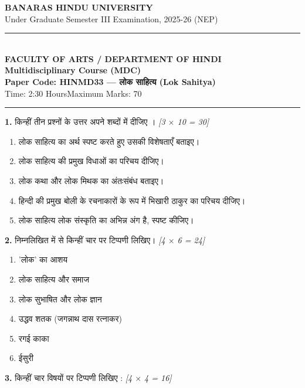 \documentclass[11pt,a4paper]{article}
\newcommand{\pts}[1]{\hfill \textit{[#1]}}
\begin{document}
\begin{center}
  {\large\bfseries BANARAS HINDU UNIVERSITY}\\[2pt]
  {\normalsize Under Graduate Semester III Examination, 2025-26 (NEP)}\\[6pt]
  \rule{0.8\linewidth}{0.5pt}\\[6pt]
  {\large\bfseries FACULTY OF ARTS / DEPARTMENT OF HINDI}\\[4pt]
  {\large\bfseries Multidisciplinary Course (MDC)}\\[4pt]
  {\large\bfseries Paper Code: HINMD33 --- लोक साहित्य (Lok Sahitya)}\\[4pt]
  {\normalsize Time: 2:30 Hours\hfill Maximum Marks: 70}
\end{center}

\rule{\linewidth}{0.4pt}\smallskip

\bigskip

\noindent \textbf{1.} किन्हीं तीन प्रश्नों के उत्तर अपने शब्दों में दीजिए । \pts{3 $\times$ 10 = 30}

\begin{enumerate}[label=(\roman*)]
  \item लोक साहित्य का अर्थ स्पष्ट करते हुए उसकी विशेषताएँ बताइए।
  \item लोक साहित्य की प्रमुख विधाओं का परिचय दीजिए।
  \item लोक कथा और लोक मिथक का अंतःसंबंध बताइए।
  \item हिन्दी की प्रमुख बोली के रचनाकारों के रूप में भिखारी ठाकुर का परिचय दीजिए।
  \item लोक साहित्य लोक संस्कृति का अभिन्न अंग है, स्पष्ट कीजिए।
\end{enumerate}

\bigskip

\noindent \textbf{2.} निम्नलिखित में से किन्हीं चार पर टिप्पणी लिखिए। \pts{4 $\times$ 6 = 24}

\begin{enumerate}[label=(\roman*)]
  \item 'लोक' का आशय
  \item लोक साहित्य और समाज
  \item लोक सुभाषित और लोक ज्ञान
  \item उद्धव शतक (जगन्नाथ दास रत्नाकर)
  \item रगई काका
  \item ईसुरी
\end{enumerate}

\bigskip

\noindent \textbf{3.} किन्हीं चार विषयों पर टिप्पणी लिखिए : \pts{4 $\times$ 4 = 16}
\end{document}

